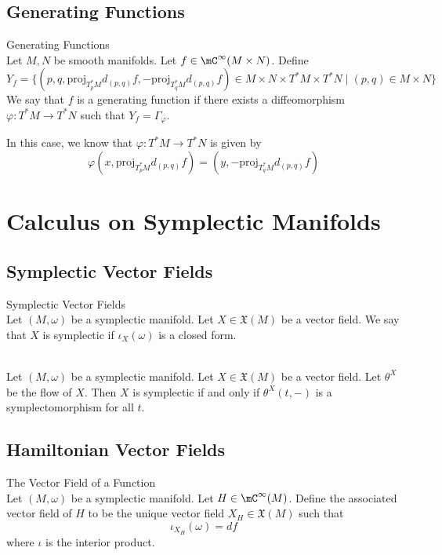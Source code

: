 \documentclass[a4paper]{article}
\begin{document}
\subsection{Generating Functions}
\begin{defn}{Generating Functions}{}\\
Let $M,N$ be smooth manifolds. Let $f\in\mC^\infty(M\times N)$. Define $$Y_f=\{(p,q,\text{proj}_{T_p^\ast M}d_{(p,q)}f,-\text{proj}_{T_q^\ast M}d_{(p,q)}f)\in M\times N\times T^\ast M\times T^\ast N\;|\;(p,q)\in M\times N\}$$ We say that $f$ is a generating function if there exists a diffeomorphism $\varphi:T^\ast M\to T^\ast N$ such that $Y_f=\Gamma_\varphi$. 
\end{defn}

In this case, we know that $\varphi:T^\ast M\to T^\ast N$ is given by $$\varphi(x,\text{proj}_{T_p^\ast M}d_{(p,q)}f)=(y,-\text{proj}_{T_q^\ast M}d_{(p,q)}f)$$

\pagebreak
\section{Calculus on Symplectic Manifolds}
\subsection{Symplectic Vector Fields}
\begin{defn}{Symplectic Vector Fields}{}\\
Let $(M,\omega)$ be a symplectic manifold. Let $X\in\mathfrak{X}(M)$ be a vector field. We say that $X$ is symplectic if $\iota_X(\omega)$ is a closed form. 
\end{defn}

\begin{prp}{}{}\\
Let $(M,\omega)$ be a symplectic manifold. Let $X\in\mathfrak{X}(M)$ be a vector field. Let $\theta^X$ be the flow of $X$. Then $X$ is symplectic if and only if $\theta^X(t,-)$ is a symplectomorphism for all $t$. 
\end{prp}

\subsection{Hamiltonian Vector Fields}
\begin{defn}{The Vector Field of a Function}{}\\
Let $(M,\omega)$ be a symplectic manifold. Let $H\in\mC^\infty(M)$. Define the associated vector field of $H$ to be the unique vector field $X_H\in\mathfrak{X}(M)$ such that $$\iota_{X_H}(\omega)=df$$ where $\iota$ is the interior product. 
\end{defn}
\end{document}
